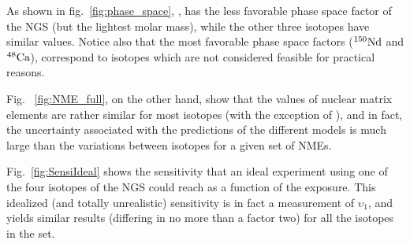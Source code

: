 As shown in fig.~\ref{fig:phase_space}, 
, has the less favorable phase space factor of the NGS (but the lightest molar mass), while the other three isotopes have similar values. Notice also that the most favorable phase space factors (${\rm ^{150}Nd}$ and ${\rm ^{48}Ca}$), correspond to isotopes which are not considered feasible for practical reasons.   

Fig.~ \ref{fig:NME_full}, on the other hand, show that the values of nuclear matrix elements are rather similar for most isotopes (with the exception of ), and in fact, the uncertainty associated with the predictions of the different models is much large than the variations between isotopes for a given set of NMEs. 

Fig.~\ref{fig:SensiIdeal} shows the sensitivity that an ideal experiment using one of the four isotopes of the NGS could reach as a function of the exposure. This idealized (and totally unrealistic) sensitivity is in fact a measurement of $\upsilon_1$, and yields similar results (differing in no more than a factor two) for all the isotopes in the set.

 
